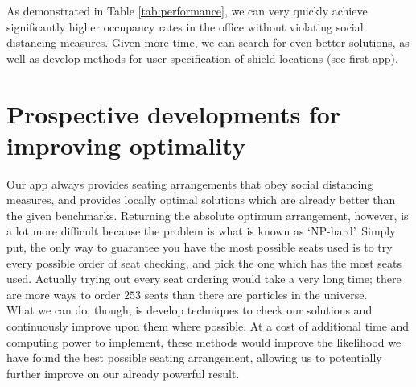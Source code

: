 \documentclass[11pt,a4paper]{article}
\begin{document}
As demonstrated in Table \ref{tab:performance}, we can very quickly achieve significantly higher occupancy rates in the office without violating social distancing measures. Given more time, we can search for even better solutions, as well as develop methods for user specification of shield locations (see first app).

\section*{Prospective developments for improving optimality}
Our app always provides seating arrangements that obey social distancing measures, and provides locally optimal solutions which are already better than the given benchmarks. Returning the  absolute optimum arrangement, however, is a lot more difficult because the problem is what is known as `NP-hard'.  Simply put, the only way to guarantee you have the most possible seats used is to try every possible order of seat checking, and pick the one which has the most seats used. Actually trying out every seat ordering would take a very long time; there are more ways to order $253$ seats than there are particles in the universe.\\

What we can do, though, is develop techniques to check our solutions and continuously improve upon them where possible. At a cost of additional time and computing power to implement, these methods would improve the likelihood we have found the best possible seating arrangement, allowing us to potentially further improve on our already powerful result.\\
\end{document}
